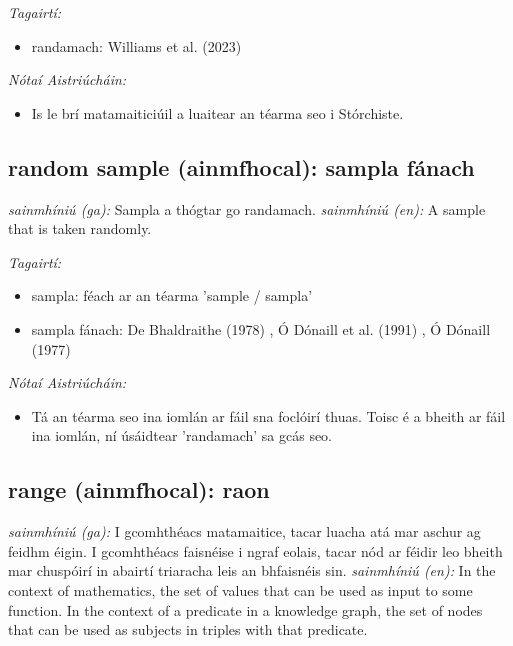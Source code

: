 \documentclass{article}
\begin{document}
 \noindent \textit{Tagairtí:}
\begin{itemize}
	\item randamach: Williams et al. (2023) \cite{storchiste}
\end{itemize}

 \noindent \textit{Nótaí Aistriúcháin:}
\begin{itemize}
	\item Is le brí matamaiticiúil a luaitear an téarma seo i Stórchiste.
\end{itemize}


\subsection*{random sample (ainmfhocal): sampla fánach} 
 \noindent \textit{sainmhíniú (ga):} Sampla a thógtar go randamach.
\newline\newline
 \noindent \textit{sainmhíniú (en):} A sample that is taken randomly.
\newline

 \noindent \textit{Tagairtí:}
\begin{itemize}
	\item sampla: féach ar an téarma 'sample / sampla'
	\item sampla fánach: De Bhaldraithe (1978) \cite{de-bhaldraithe}, Ó Dónaill et al. (1991) \cite{focloir-beag}, Ó Dónaill (1977) \cite{odonaill}
\end{itemize}

 \noindent \textit{Nótaí Aistriúcháin:}
\begin{itemize}
	\item Tá an téarma seo ina iomlán ar fáil sna foclóirí thuas. Toisc é a bheith ar fáil ina iomlán, ní úsáidtear 'randamach' sa gcás seo.
\end{itemize}


\subsection*{range (ainmfhocal): raon} 
 \noindent \textit{sainmhíniú (ga):} I gcomhthéacs matamaitice, tacar luacha atá mar aschur ag feidhm éigin. I gcomhthéacs faisnéise i ngraf eolais, tacar nód ar féidir leo bheith mar chuspóirí in abairtí triaracha leis an bhfaisnéis sin.
\newline\newline
 \noindent \textit{sainmhíniú (en):} In the context of mathematics, the set of values that can be used as input to some function. In the context of a predicate in a knowledge graph, the set of nodes that can be used as subjects in triples with that predicate.
\newline
\end{document}
